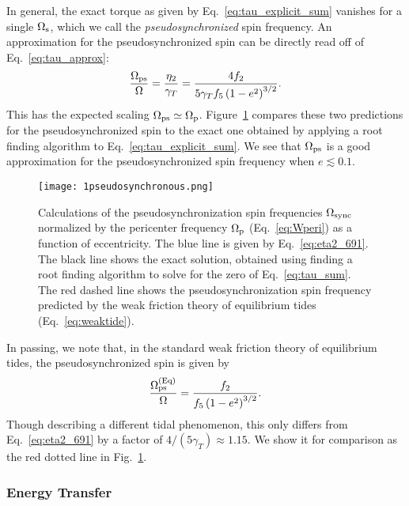 \documentclass[
        fleqn,
        usenatbib,
    ]{mnras}
\newcommand*{\p}[1]{\left(#1\right)}
\begin{document}
In general, the exact torque as given by Eq.~\eqref{eq:tau_explicit_sum}
vanishes for a single $\Omega_{\rm s}$, which we call the
\emph{pseudosynchronized} spin frequency. An approximation for the
pseudosynchronized spin can be directly read off of Eq.~\eqref{eq:tau_approx}:
\begin{equation}
    \frac{\Omega_{\rm ps}}{\Omega} =
        \frac{\eta_2}{\gamma_T} = \frac{4f_2}{5\gamma_T f_5\p{1 -
        e^2}^{3/2}}.\label{eq:eta2_691}
\end{equation}
This has the expected scaling $\Omega_{\rm ps} \simeq \Omega_{\rm p}$.
Figure~\ref{fig:pseudosync} compares these two predictions for the
pseudosynchronized spin to the exact one obtained by applying a root finding
algorithm to Eq.~\eqref{eq:tau_explicit_sum}. We see that $\Omega_{\rm ps}$ is a
good approximation for the pseudosynchronized spin frequency when $e \lesssim
0.1$.
\begin{figure}
    \centering
    \texttt{[image: 1pseudosynchronous.png]}
    \caption{Calculations of the pseudosynchronization spin frequencies
    $\Omega_{\rm sync}$ normalized by the pericenter frequency $\Omega_{\rm p}$
    (Eq.~\ref{eq:Wperi}) as a function of eccentricity. The blue line is given
    by Eq.~\eqref{eq:eta2_691}. The black line shows the exact solution,
    obtained using finding a root finding algorithm to solve for the zero of
    Eq.~\eqref{eq:tau_sum}. The red dashed line shows the pseudosynchronization
    spin frequency predicted by the weak friction theory of equilibrium tides
    (Eq.~\ref{eq:weaktide}).
    }\label{fig:pseudosync}
\end{figure}

In passing, we note that, in the standard weak friction theory of equilibrium
tides, the pseudosynchronized spin is given by \citep{alexander73, hut81}
\begin{equation}
    \frac{\Omega_{\rm ps}^{\rm (Eq)}}{\Omega} = \frac{f_2}{f_5\p{1 -
        e^2}^{3/2}}.\label{eq:weaktide}
\end{equation}
Though describing a different tidal phenomenon, this only differs from
Eq.~\eqref{eq:eta2_691} by a factor of $4 / (5\gamma_{T}) \approx 1.15$. We show
it for comparison as the red dotted line in Fig.~\ref{fig:pseudosync}.

\subsubsection{Energy Transfer}
\end{document}
